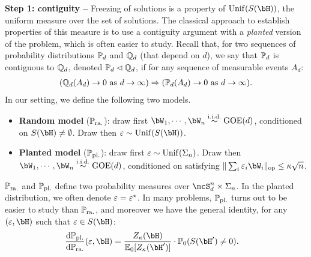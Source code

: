 \myskip 
\textbf{Step 1: contiguity --}
Freezing of solutions is a property of $\Unif(S(\bH))$, the uniform measure over the set of solutions.
The classical approach to establish properties of this measure is to use a contiguity argument with a \emph{planted} version of the problem, 
which is often easier to study.
Recall that, for two sequences of probability distributions $\mathbb{P}_d$ and $\mathbb{Q}_d$ (that depend on $d$), we say that $\mathbb{P}_d$ is contiguous to $\mathbb{Q}_d$, denoted $\mathbb{P}_d \lhd \mathbb{Q}_d$, 
if for any sequence of measurable events $A_d$:
\begin{align}\label{eq:contiguity}
(\mathbb{Q}_d(A_d) \to 0 \textrm{ as } d \to \infty)
 \Rightarrow 
(\mathbb{P}_d(A_d) \to 0 \textrm{ as } d \to \infty).
\end{align}
In our setting, we define the following two models.
\begin{itemize}[leftmargin=*]
    \item \textbf{Random model} ($\mathbb{P}_{\mathrm{ra.}}$): draw first $\bW_1, \cdots, \bW_n \iid \GOE(d)$, conditioned on $S(\bH) \neq \emptyset$.
    Draw then $\eps \sim \Unif(S(\bH))$.
    \item \textbf{Planted model} ($\mathbb{P}_{\mathrm{pl.}}$): draw first $\varepsilon \sim \mathrm{Unif}(\Sigma_n)$. Draw then $\bW_1, \cdots, \bW_n \iid \GOE(d)$, conditioned on 
    satisfying $\|\sum_i \eps_i \bW_i\|_\op \leq \kappa \sqrt{n}$.
\end{itemize}
$\mathbb{P}_{\mathrm{ra.}}$ and $\mathbb{P}_{\mathrm{pl.}}$ define two probability measures over $\mcS_d^n \times \Sigma_n$. In the planted distribution, 
we often denote $\varepsilon = \varepsilon^\star$.
In many problems, $\mathbb{P}_{\mathrm{pl.}}$ turns out to be easier to study than $\mathbb{P}_{\mathrm{ra.}}$, and moreover we have the general identity, 
for any $(\eps, \bH)$ such that $\eps \in S(\bH)$:
\begin{align}\label{eq:planted_random}
    \frac{\rd \bbP_{\pl}}{\rd \bbP_{\ra}}(\eps, \bH) &= \frac{Z_\kappa(\bH)}{\EE_0[Z_\kappa(\bH')]} \cdot \bbP_0(S(\bH') \neq 0).
\end{align}
